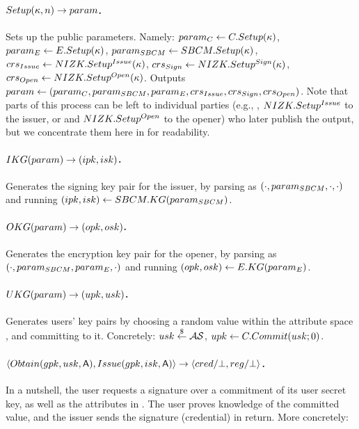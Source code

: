 \paragraph{$Setup(\kappa,n) \rightarrow param$.} %
Sets up the public parameters. Namely: $param_C \gets C.Setup(\kappa)$, $param_{E}
\gets E.Setup(\kappa)$, $param_{SBCM} \gets SBCM.Setup(\kappa)$,
$crs_{Issue} \gets NIZK.Setup^{Issue}(\kappa)$, $crs_{Sign} \gets
NIZK.Setup^{Sign} (\kappa)$, $crs_{Open}\gets NIZK.Setup^{Open}(\kappa)$.
Outputs $param \gets (param_C,param_{SBCM},param_{E},crs_{Issue},crs_{Sign},
crs_{Open})$. Note that parts of this process can be left to individual
parties (e.g., \SBCMSetup, $NIZK.Setup^{Issue}$ to the issuer, or \ESetup and
$NIZK.Setup^{Open}$ to the opener) who later publish the output, but we
concentrate them here in \Setup for readability.

\paragraph{$IKG(param) \rightarrow (ipk,isk)$.} %
Generates the signing key pair for the issuer, by parsing \parm as
$(\cdot,param_{SBCM},\cdot,\cdot)$ and running $(ipk,isk) \gets
SBCM.KG(param_{SBCM})$.

\paragraph{$OKG(param) \rightarrow (opk,osk)$.} %
Generates the encryption key pair for the opener, by parsing \parm as
$(\cdot,param_{SBCM},param_{E},\cdot)$ and running $(opk,osk) \gets
E.KG(param_{E})$.

\paragraph{$UKG(param) \rightarrow (upk,usk)$.} %
Generates users' key pairs by choosing a random value within the attribute space
\AttrSpace, and committing to it. Concretely: $usk \stackrel{\$}{\gets} \mathcal{AS}$, $upk
\gets C.Commit(usk; 0)$.

\paragraph{$\langle Obtain(gpk,usk,\mathsf{A}),Issue(gpk,isk,\mathsf{A}) \rangle
  \rightarrow \langle cred/\bot,reg/\bot \rangle$.} %
In a nutshell, the user requests a signature over a commitment of its user
secret key, as well as the attributes in \Attrs. The user proves knowledge of
the committed value, and the issuer sends the signature (credential) in return.
More concretely:

